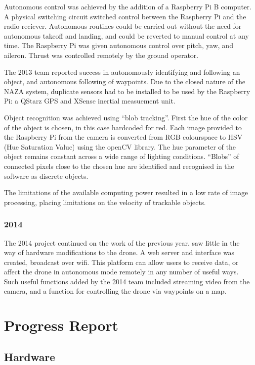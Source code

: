 \documentclass{article}
\begin{document}
Autonomous control was achieved by the addition of a Raspberry Pi B computer. A physical switching circuit switched control between the Raspberry Pi and the radio reciever. Autonomous routines could be carried out without the need for autonomous takeoff and landing, and could be reverted to manual control at any time. The Raspberry Pi was given autonomous control over pitch, yaw, and aileron. Thrust was controlled remotely by the ground operator. 

The 2013 team reported success in autonomously identifying and following an object, and autonomous following of waypoints. Due to the closed nature of the NAZA system, duplicate sensors had to be installed to be used by the Raspberry Pi: a QStarz GPS and XSense inertial measuement unit.

 Object recognition was achieved using “blob tracking”. First the hue of the color of the object is chosen, in this case hardcoded for red. Each image provided to the Raspberry Pi from the camera is converted from RGB colourspace to HSV (Hue Saturation Value) using the openCV library. The hue parameter of the object remains constant across a wide range of lighting conditions. “Blobs” of connected pixels close to the chosen hue are identified and recognised in the software as discrete objects.

The limitations of the available computing power resulted in a low rate of image processing, placing limitations on the velocity of trackable objects.

		\subsubsection{2014}
The 2014 project continued on the work of the previous year\cite{Baxter}\cite{Mazur}\cite{Targhagh}. saw little in the way of hardware modifications to the drone. A web server and interface was created, broadcast over wifi. This platform can allow users to receive data, or affect the drone in autonomous mode remotely in any number of useful ways. Such useful functions added by the 2014 team included streaming video from the camera, and a function for controlling the drone via waypoints on a map.

\section{Progress Report}
	\subsection{Hardware}
\end{document}
